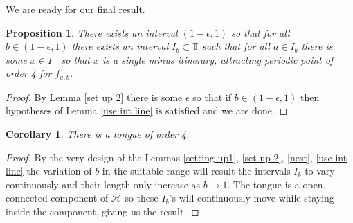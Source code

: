 \documentclass[12pt]{amsart}
\numberwithin{equation}{section}
\newtheorem{proposition}{Proposition}[section]
\newtheorem{corollary}[theorem]{Corollary}
\theoremstyle{remark}
\begin{document}
We are ready for our final result.

\begin{proposition}
    There exists an interval $(1-\epsilon,1)$ so that for all $b \in (1-\epsilon,1) $ there exists an interval $I_b \subset \mathbb{T}$ such that for all $a \in I_b$ there is some  $ x\in I_{-}$ so that $x$ is a single minus itinerary, attracting periodic point of order 4 for $f_{a,b}$.
\end{proposition}
\begin{proof}
    By Lemma \ref{set up 2} there is some $\epsilon$ so that if $b \in (1-\epsilon, 1)$ then hypotheses of Lemma \ref{use int line} is satisfied and we are done.
\end{proof}

\begin{corollary}
    There is a tongue of order 4.
\end{corollary}
\begin{proof}
   By  the very design of the Lemmas \ref{setting up1}, \ref{set up 2}, \ref{nest}, \ref{use int line} the variation of $b$ in the suitable range will result the intervals $I_b$ to vary continuously and their length only increase as $b \to 1$. The tongue is a open, connected component of $\mathcal{H}$ so these $I_b$'s will continuously move while staying inside the component, giving us the result.
   \end{proof}
\end{document}
